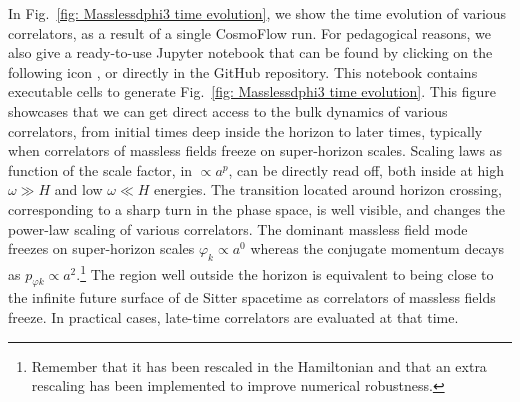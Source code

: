 \documentclass[11pt]{article}
\numberwithin{equation}{section} %
\begin{document}
\vskip 4pt
In Fig.~\ref{fig: Masslessdphi3 time evolution}, we show the time evolution of various correlators, as a result of a single \textsf{CosmoFlow} run. For pedagogical reasons, we also give a ready-to-use Jupyter notebook that can be found by clicking on the following icon \href{https://github.com/deniswerth/CosmoFlow/blob/main/CosmoFlow/Massless_dphi3/MyFirstRun.ipynb}{\faGithub}, or directly in the GitHub repository. This notebook contains executable cells to generate Fig.~\ref{fig: Masslessdphi3 time evolution}. This figure showcases that we can get direct access to the bulk dynamics of various correlators, from initial times deep inside the horizon to later times, typically when correlators of massless fields freeze on super-horizon scales. Scaling laws as function of the scale factor, in $\propto a^p$, can be directly read off, both inside at high $\omega \gg H$ and low $\omega \ll H$ energies. The transition located around horizon crossing, corresponding to a sharp turn in the phase space, is well visible, and changes the power-law scaling of various correlators. The dominant massless field mode freezes on super-horizon scales $\varphi_k \propto a^0$ whereas the conjugate momentum decays as $p_{\varphi k} \propto a^2$.\footnote{Remember that it has been rescaled in the Hamiltonian and that an extra rescaling has been implemented to improve numerical robustness.} The region well outside the horizon is equivalent to being close to the infinite future surface of de Sitter spacetime as correlators of massless fields freeze. In practical cases, late-time correlators are evaluated at that time.
\end{document}
